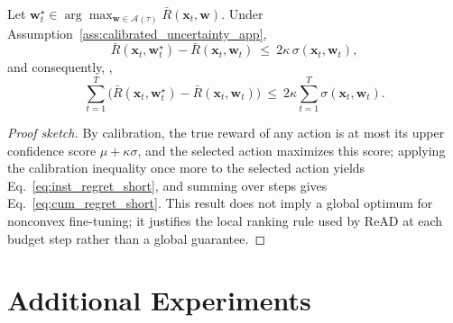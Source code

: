 \begin{proposition}\label{prop:regret}
    Let $\mathbf{w}_t^\star\in\arg\max_{\mathbf{w}\in\mathcal{A}(\tau)} \bar R(\mathbf{x}_t,\mathbf{w})$. Under Assumption~\ref{ass:calibrated_uncertainty_app}, 
\begin{equation}
\bar R(\mathbf{x}_t,\mathbf{w}_t^\star)-\bar R(\mathbf{x}_t,\mathbf{w}_t)\ \le\ 2\kappa\,\sigma(\mathbf{x}_t,\mathbf{w}_t),
\label{eq:inst_regret_short}
\end{equation}
and consequently, ,
\begin{equation}
\sum_{t=1}^T \Big(\bar R(\mathbf{x}_t,\mathbf{w}_t^\star)-\bar R(\mathbf{x}_t,\mathbf{w}_t)\Big)
\ \le\ 2\kappa\sum_{t=1}^T \sigma(\mathbf{x}_t,\mathbf{w}_t).
\label{eq:cum_regret_short}
\end{equation}
\end{proposition}
\begin{proof}[Proof sketch]
By calibration, the true reward of any action is at most its upper confidence score $\mu+\kappa\sigma$, and the selected action maximizes this score; applying the calibration inequality once more to the selected action yields Eq.~\eqref{eq:inst_regret_short}, and summing over steps gives Eq.~\eqref{eq:cum_regret_short}. This result does not imply a global optimum for nonconvex fine-tuning; it justifies the local ranking rule used by ReAD at each budget step rather than a global guarantee.
\end{proof}

\section{Additional Experiments}\label{sec:app_experiment}



